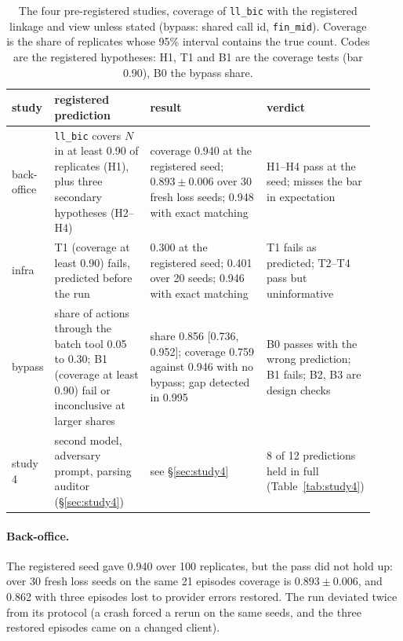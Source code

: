 \documentclass[11pt]{article}
\begin{document}
\begin{table}[h]
\centering\small
\renewcommand{\arraystretch}{1.15}
\begin{tabular}{@{}p{0.11\linewidth}p{0.27\linewidth}p{0.34\linewidth}p{0.20\linewidth}@{}}
\toprule
study & registered prediction & result & verdict \\
\midrule
back-office & \texttt{ll\_bic} covers $N$ in at least 0.90 of replicates (H1), plus three
secondary hypotheses (H2--H4) & coverage 0.940 at the registered seed; $0.893 \pm 0.006$
over 30 fresh loss seeds; 0.948 with exact matching & H1--H4 pass at the seed; misses the
bar in expectation \\
infra & T1 (coverage at least 0.90) fails, predicted before the run & 0.300 at the
registered seed; 0.401 over 20 seeds; 0.946 with exact matching & T1 fails as predicted;
T2--T4 pass but uninformative \\
bypass & share of actions through the batch tool 0.05 to 0.30; B1 (coverage at least 0.90)
fail or inconclusive at larger shares & share 0.856 [0.736, 0.952]; coverage 0.759 against
0.946 with no bypass; gap detected in 0.995 & B0 passes with the wrong prediction; B1
fails; B2, B3 are design checks \\
study 4 & second model, adversary prompt, parsing auditor (\S\ref{sec:study4}) & see
\S\ref{sec:study4} & 8 of 12 predictions held in full (Table~\ref{tab:study4}) \\
\bottomrule
\end{tabular}
\caption{The four pre-registered studies, coverage of \texttt{ll\_bic} with the registered
linkage and view unless stated (bypass: shared call id, \texttt{fin\_mid}). Coverage is the
share of replicates whose 95\% interval contains the true count. Codes are the registered
hypotheses: H1, T1 and B1 are the coverage tests (bar 0.90), B0 the bypass share.}
\label{tab:prereg}
\end{table}

\paragraph{Back-office.} The registered seed gave 0.940 over 100 replicates, but the pass
did not hold up: over 30 fresh loss seeds on the same 21 episodes coverage is
$0.893 \pm 0.006$, and 0.862 with three episodes lost to provider errors restored. The
run deviated twice from its protocol (a crash forced a rerun on the same seeds, and the
three restored episodes came on a changed client).
\end{document}
